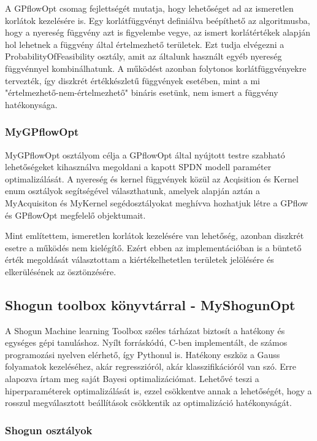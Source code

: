 A GPflowOpt csomag fejlettségét mutatja, hogy lehetőséget ad az ismeretlen korlátok kezelésére is. Egy korlátfüggvényt definiálva beépíthető az algoritmusba, hogy a nyereség függvény azt is figyelembe vegye, az ismert korlátértékek alapján hol lehetnek a függvény által értelmezhető területek. Ezt tudja elvégezni a ProbabilityOfFeasibility osztály, amit az általunk használt egyéb nyereség függvénnyel kombinálhatunk. A működést azonban folytonos korlátfüggvényekre tervezték, így diszkrét értékkészletű függvények esetében, mint a mi "értelmezhető-nem-értelmezhető" bináris esetünk, nem ismert a függvény hatékonysága.

\subsubsection{MyGPflowOpt}
MyGPflowOpt osztályom célja a GPflowOpt által nyújtott testre szabható lehetőségeket kihasználva megoldani a kapott SPDN modell paraméter optimalizálását. A nyereség és kernel függvények közül az Acqisition és Kernel enum osztályok segítségével választhatunk, amelyek alapján aztán a MyAcquisiton és MyKernel segédosztályokat meghívva hozhatjuk létre a GPflow és GPflowOpt megfelelő objektumait.


Mint említettem, ismeretlen korlátok kezelésére van lehetőség, azonban diszkrét esetre a működés nem kielégítő. Ezért ebben az implementációban is a büntető érték megoldását választottam a kiértékelhetetlen területek jelölésére és elkerülésének az ösztönzésére.

\subsection{Shogun toolbox könyvtárral - MyShogunOpt}

A Shogun Machine learning Toolbox széles tárházat biztosít a hatékony és egységes gépi tanuláshoz. Nyílt forráskódú, C-ben implementált, de számos programozási nyelven elérhető, így Pythonul is. Hatékony eszköz a Gauss folyamatok kezeléséhez, akár regresszióról, akár klasszifikációról van szó. Erre alapozva írtam meg saját Bayesi optimalizációmat. Lehetővé teszi a hiperparaméterek optimalizálását is, ezzel csökkentve annak a lehetőségét, hogy a rosszul megválasztott beállítások csökkentik az optimalizáció hatékonyságát.

\subsubsection{Shogun osztályok}

